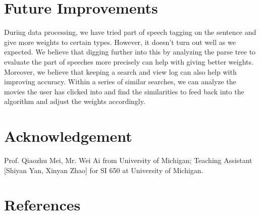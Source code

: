 \documentclass[letterpaper,10pt]{article}
\begin{document}
\begin{multicols}{2}
    \section{Future Improvements}
    During data processing, we have tried part of speech tagging on the sentence and give more weights to certain types. However, it doesn’t turn out well as we expected. We believe that digging further into this by analyzing the parse tree to evaluate the part of speeches more precisely can help with giving better weights.
    Moreover, we believe that keeping a search and view log can also help with improving accuracy. Within a series of similar searches, we can analyze the movies the user has clicked into and find the similarities to feed back into the algorithm and adjust the weights accordingly.

    \section{Acknowledgement}

    Prof. Qiaozhu Mei, Mr. Wei Ai from University of Michigan;
    Teaching Assistant [Shiyan Yan, Xinyan Zhao] for SI 650 at University of Michigan.

    \section*{References}





\end{multicols}
\end{document}
